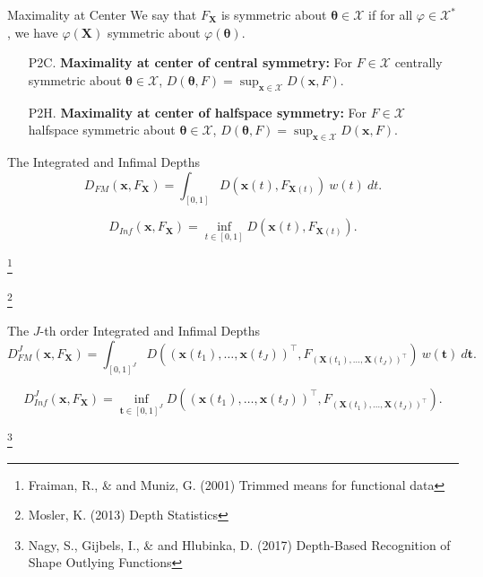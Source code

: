 \documentclass[handout, notes]{beamer}
\newcommand{\vx}{\bm{x}}
\newcommand{\vX}{\bm{X}}
\newcommand{\vth}{\bm{\theta}}
\newcommand\blfootnote[1]{%
  \begingroup
  \renewcommand\thefootnote{}\footnote{#1}%
  \addtocounter{footnote}{-1}%
  \endgroup
}
\begin{document}
    \begin{frame}{Maximality at Center}
        We say that $F_{\vX}$ is symmetric about $\vth \in \mathscr{X}$ if for
        all $\varphi \in \mathscr{X}^*$, we have $\varphi(\vX)$ symmetric
        about $\varphi(\vth)$.

        \begin{enumerate}
            \item[P2C.] \textbf{Maximality at center of central symmetry:} For
            $F \in \mathscr{X}$ centrally symmetric about $\vth \in
            \mathscr{X}$, $D(\vth, F) = \sup_{\vx \in \mathscr{X}} D(\vx, F)$.

            \item[P2H.] \textbf{Maximality at center of halfspace symmetry:} For
            $F \in \mathscr{X}$ halfspace symmetric about $\vth \in
            \mathscr{X}$, $D(\vth, F) = \sup_{\vx \in \mathscr{X}} D(\vx, F)$.
        \end{enumerate}
    \end{frame}

    \begin{frame}{The Integrated and Infimal Depths}
        \[
            D_{FM}(\vx, F_{\vX}) = \int_{[0, 1]} D(\vx(t), F_{\vX(t)})\:w(t)\:dt.
        \]

        \[
            D_{Inf}(\vx, F_{\vX}) = \inf_{t \in [0, 1]} D(\vx(t), F_{\vX(t)}).
        \]

        \blfootnote{
            Fraiman, R., \& and Muniz, G. (2001) Trimmed means for functional
            data
        }
        \blfootnote{
            Mosler, K. (2013) Depth Statistics
        }
    \end{frame}

    \begin{frame}{The $J$-th order Integrated and Infimal Depths}
        \[
            D_{FM}^J(\vx, F_{\vX}) = \int_{[0, 1]^J} D((\vx(t_1), \dots, \vx(t_J))^\top, F_{(\vX(t_1), \dots, \vX(t_J))^\top})\:w(\bm{t})\:d\bm{t}.
        \]

        \[
            D_{Inf}^J(\vx, F_{\vX}) = \inf_{\bm{t} \in [0, 1]^J} D((\vx(t_1), \dots, \vx(t_J))^\top, F_{(\vX(t_1), \dots, \vX(t_J))^\top}).
        \]

        \blfootnote{
            Nagy, S., Gijbels, I., \& and Hlubinka, D. (2017) Depth-Based
            Recognition of Shape Outlying Functions
        }
    \end{frame}

\end{document}
